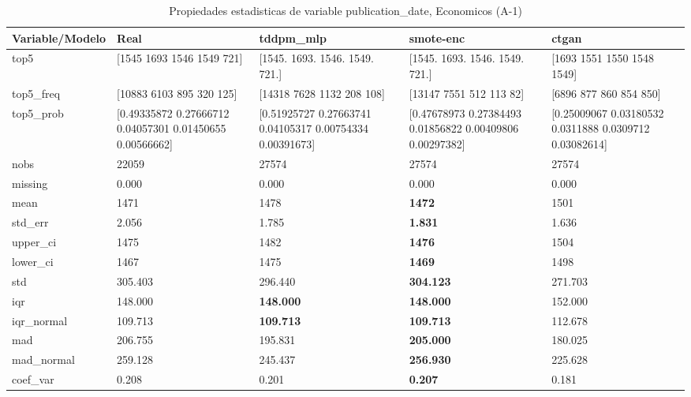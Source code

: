 \begin{table}[H]
\centering
\fontsize{8}{14}\selectfont
\caption{Propiedades  estadisticas de variable publication\_date, Economicos (A-1)}
\label{table-stats-economicos-a-1-publication_date}
\begin{tabular}{|l|m{10em}|m{10em}|m{10em}|m{10em}|}
\hline
 \rowcolor[gray]{0.8}
Variable/Modelo & Real & tddpm\_mlp & smote-enc & ctgan \\
\hline top5 & [1545 1693 1546 1549  721] & [1545. 1693. 1546. 1549.  721.] & [1545. 1693. 1546. 1549.  721.] & [1693 1551 1550 1548 1549] \\
\hline top5\_freq & [10883  6103   895   320   125] & [14318  7628  1132   208   108] & [13147  7551   512   113    82] & [6896  877  860  854  850] \\
\hline top5\_prob & [0.49335872 0.27666712 0.04057301 0.01450655 0.00566662] & [0.51925727 0.27663741 0.04105317 0.00754334 0.00391673] & [0.47678973 0.27384493 0.01856822 0.00409806 0.00297382] & [0.25009067 0.03180532 0.0311888  0.0309712  0.03082614] \\
\hline nobs & 22059 & 27574 & 27574 & 27574 \\
\hline missing & 0.000 & 0.000 & 0.000 & 0.000 \\
\hline mean & 1471 & 1478 & \bfseries 1472 & \cellcolor[rgb]{0.9, 0.54, 0.52} 1501 \\
\hline std\_err & 2.056 & 1.785 & \bfseries 1.831 & \cellcolor[rgb]{0.9, 0.54, 0.52} 1.636 \\
\hline upper\_ci & 1475 & 1482 & \bfseries 1476 & \cellcolor[rgb]{0.9, 0.54, 0.52} 1504 \\
\hline lower\_ci & 1467 & 1475 & \bfseries 1469 & \cellcolor[rgb]{0.9, 0.54, 0.52} 1498 \\
\hline std & 305.403 & 296.440 & \bfseries 304.123 & \cellcolor[rgb]{0.9, 0.54, 0.52} 271.703 \\
\hline iqr & 148.000 & \bfseries 148.000 & \bfseries 148.000 & \cellcolor[rgb]{0.9, 0.54, 0.52} 152.000 \\
\hline iqr\_normal & 109.713 & \bfseries 109.713 & \bfseries 109.713 & \cellcolor[rgb]{0.9, 0.54, 0.52} 112.678 \\
\hline mad & 206.755 & 195.831 & \bfseries 205.000 & \cellcolor[rgb]{0.9, 0.54, 0.52} 180.025 \\
\hline mad\_normal & 259.128 & 245.437 & \bfseries 256.930 & \cellcolor[rgb]{0.9, 0.54, 0.52} 225.628 \\
\hline coef\_var & 0.208 & 0.201 & \bfseries 0.207 & \cellcolor[rgb]{0.9, 0.54, 0.52} 0.181 \\

\end{tabular}
\end{table}
